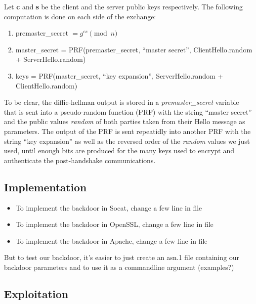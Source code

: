 \documentclass[a4paper,11pt,twocolumn]{article}
\begin{document}

Let \textbf{c} and \textbf{s} be the client and the server public keys respectively. The following computation is done on each side of the exchange:

\begin{enumerate}
  \item premaster\_secret $ = g^{cs}\pmod{n}$
  \item master\_secret = PRF(premaster\_secret, ``master secret'', ClientHello.random + ServerHello.random)
  \item keys = PRF(master\_secret, ``key expansion'', ServerHello.random + ClientHello.random)
\end{enumerate}

To be clear, the diffie-hellman output is stored in a \emph{premaster\_secret} variable that is sent into a pseudo-random function (PRF) with the string ``master secret'' and the public values \emph{random} of both parties taken from their Hello message as parameters. The output of the PRF is sent repeatidly into another PRF with the string ``key expansion'' as well as the reversed order of the \emph{random} values we just used, until enough bits are produced for the many keys used to encrypt and authenticate the post-handshake communications.


\subsection{Implementation}

\begin{itemize}
    \item To implement the backdoor in Socat, change a few line in file
    \item To implement the backdoor in OpenSSL, change a few line in file
    \item To implement the backdoor in Apache, change a few line in file
\end{itemize}

But to test our backdoor, it's easier to just create an asn.1 file containing our backdoor parameters and to use it as a commandline argument (examples?)

\subsection{Exploitation}
\end{document}
